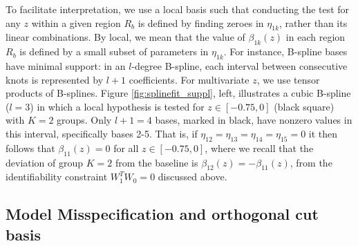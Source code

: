 To facilitate interpretation, we use a local basis such that conducting the test for any $z$ within a given region $R_b$
is defined by finding zeroes in $\eta_{1k}$, rather than its linear combinations. %
By local, we mean that the value of $\beta_{1k}(z)$ in each region $R_b$ is defined by a small subset of parameters in $\eta_{1k}$.  For instance, B-spline bases have minimal support: in an $l$-degree B-spline, each interval between consecutive knots is represented by $l+1$ coefficients.
 For multivariate $z$, we use tensor products of B-splines. 
Figure \ref{fig:splinefit_suppl}, left, illustrates a cubic B-spline ($l=3$) in which a local hypothesis is tested for $z \in [-0.75, 0]$ (black square) with $K=2$ groups. 
Only $l+1=4$ bases, marked in black, have nonzero values in this interval, specifically bases 2-5. That is, if $\eta_{12}=\eta_{13}=\eta_{14}=\eta_{15}=0$ it then follows that $\beta_{11}(z)= 0$ for all $z \in [-0.75, 0]$, where we recall that the deviation of group $K=2$ from the baseline is $\beta_{12}(z) = -\beta_{11}(z)$, from the identifiability constraint $W_1^T W_0=0$ discussed above.


\subsection{Model Misspecification and orthogonal cut basis}
\label{ssec:misspec}

